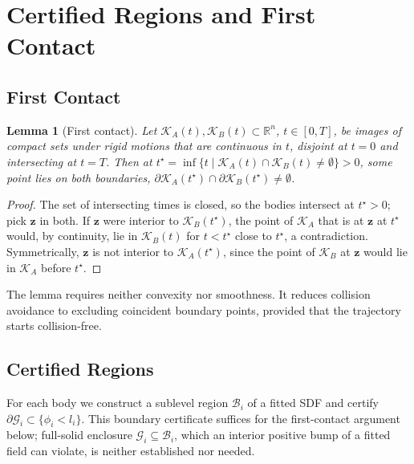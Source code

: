 \documentclass[journal]{IEEEtran}
\newtheorem{lemma}{Lemma}
\theoremstyle{definition}
\newcommand{\R}{\mathbb{R}}
\begin{document}
\section{Certified Regions and First Contact}\label{sec:regions}

\subsection{First Contact}
\begin{lemma}[First contact]\label{lem:contact}
Let $\mathcal K_A(t),\mathcal K_B(t)\subset\R^n$, $t\in[0,T]$, be images of compact sets under rigid
motions that are continuous in $t$, disjoint at $t=0$ and intersecting at $t=T$. Then at
$t^\star=\inf\{t\mid\mathcal K_A(t)\cap\mathcal K_B(t)\neq\emptyset\}>0$, some point lies on both
boundaries, $\partial\mathcal K_A(t^\star)\cap\partial\mathcal K_B(t^\star)\neq\emptyset$.
\end{lemma}
\begin{proof}
The set of intersecting times is closed, so the bodies intersect at $t^\star>0$; pick $\mathbf z$
in both. If $\mathbf z$ were interior to $\mathcal K_B(t^\star)$, the point of $\mathcal K_A$ that
is at $\mathbf z$ at $t^\star$ would, by continuity, lie in $\mathcal K_B(t)$ for $t<t^\star$ close
to $t^\star$, a contradiction. Symmetrically, $\mathbf z$ is not interior to $\mathcal K_A(t^\star)$,
since the point of $\mathcal K_B$ at $\mathbf z$ would lie in $\mathcal K_A$ before $t^\star$.
\end{proof}
The lemma requires neither convexity nor smoothness. It reduces collision avoidance to excluding
coincident boundary points, provided that the trajectory starts collision-free.

\subsection{Certified Regions}\label{sec:cert-body}
For each body we construct a sublevel region $\mathcal B_i$ of a fitted SDF and certify
$\partial\mathcal G_i\subset\{\phi_i<l_i\}$. This boundary certificate suffices for the
first-contact argument below; full-solid enclosure $\mathcal G_i\subseteq\mathcal B_i$, which an
interior positive bump of a fitted field can violate, is neither established nor needed.
\end{document}
